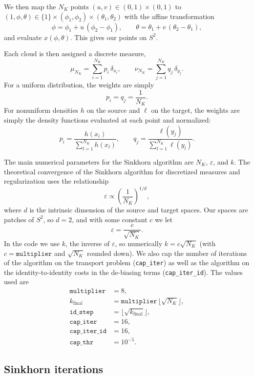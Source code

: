 \documentclass{article}
\begin{document}
We then map the $N_K$ points $(u,v)\in(0,1)\times(0,1)$ to
$(1,\phi,\theta)\in\{1\}\times(\phi_1,\phi_2)\times(\theta_1,\theta_2)$ with the
affine transformation
\[
    \phi=\phi_1+u\,(\phi_2-\phi_1),
    \qquad
    \theta=\theta_1+v\,(\theta_2-\theta_1),
\]
and evaluate $x(\phi,\theta)$.  This gives our points on $S^2$.

Each cloud is then assigned a discrete measure,
\[
    \mu_{N_K}=\sum_{i=1}^{N_K}p_i\,\delta_{x_i},
    \qquad
    \nu_{N_K}=\sum_{j=1}^{N_K}q_j\,\delta_{y_j}.
\]
For a uniform distribution, the weights are simply
\[
    p_i=q_j=\frac{1}{N_K}.
\]
For nonuniform densities $h$ on the source and $\ell$ on the target, the weights
are simply the density functions evaluated at each point and normalized:
\[
    p_i=\frac{h(x_i)}{\sum_{l=1}^{N_K}h(x_l)},
    \qquad
    q_j=\frac{\ell(y_j)}{\sum_{l=1}^{N_K}\ell(y_l)}.
\]

The main numerical parameters for the Sinkhorn algorithm are $N_K$,
$\varepsilon$, and $k$.  The theoretical convergence of the Sinkhorn algorithm
for discretized measures and regularization uses the relationship
\[
    \varepsilon\propto\left(\frac{1}{N_K}\right)^{1/d},
\]
where $d$ is the intrinsic dimension of the source and target spaces.  Our
spaces are patches of $S^2$, so $d=2$, and with some constant $c$ we let
\[
    \varepsilon=\frac{c}{\sqrt{N_K}}.
\]
In the code we use $k$, the inverse of $\varepsilon$, so numerically
$k=c\sqrt{N_K}$ (with $c=\texttt{multiplier}$ and $\sqrt{N_K}$ rounded down).
We also cap the number of iterations of the algorithm on the transport problem
(\texttt{cap\_iter}) as well as the algorithm on the identity-to-identity
costs in the de-biasing terms (\texttt{cap\_iter\_id}).  The values used are
\begin{align*}
    \texttt{multiplier} &= 8, \\
    k_{\mathrm{final}} &= \texttt{multiplier}\,\lfloor\sqrt{N_K}\rfloor, \\
    \texttt{id\_step} &= \lfloor\sqrt{k_{\mathrm{final}}}\rfloor, \\
    \texttt{cap\_iter} &= 16, \\
    \texttt{cap\_iter\_id} &= 16, \\
    \texttt{cap\_thr} &= 10^{-5}.
\end{align*}

\subsection{Sinkhorn iterations}
\end{document}
